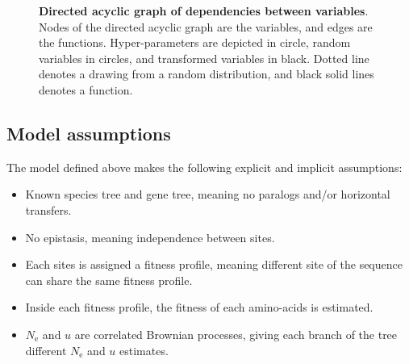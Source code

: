 \documentclass{article}
\newcommand{\e}{\mathrm{e}}
\newcommand{\Ne}{N_\e}
\begin{document}
\begin{figure}[H]
	\caption{\textbf{Directed acyclic graph of dependencies between variables}. Nodes of the directed acyclic graph are the variables, and edges are the functions. Hyper-parameters are depicted in {\color{RED}{red}} circle, random variables in {\color{BLUE}{blue}} circles, and transformed variables in black. Dotted {\color{BLUE}{blue}} line denotes a drawing from a random distribution, and black solid lines denotes a function. }
\end{figure}

\subsection{Model assumptions}

The model defined above makes the following explicit and implicit assumptions:
\begin{itemize}
	\setlength\itemsep{-0.25em}
	\item Known species tree and gene tree, meaning no paralogs and/or horizontal transfers.
	\item No epistasis, meaning independence between sites.
	\item Each sites is assigned a fitness profile, meaning different site of the sequence can share the same fitness profile.
	\item Inside each fitness profile, the fitness of each amino-acids is estimated.
	\item $\Ne$ and $u$ are correlated Brownian processes, giving each branch of the tree different $\Ne$ and $u$ estimates.
\end{itemize}
\end{document}
